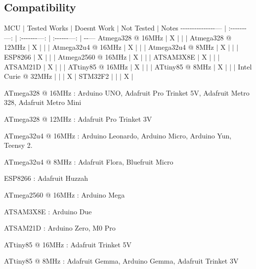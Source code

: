 \subsection*{Compatibility}

M\+CU $\vert$ Tested Works $\vert$ Doesn\textquotesingle{}t Work $\vert$ Not Tested $\vert$ Notes -\/-\/-\/-\/-\/-\/-\/-\/-\/-\/-\/-\/-\/-\/-\/--- $\vert$ \+:-\/-\/-\/-\/-\/-\/-\/---\+: $\vert$ \+:-\/-\/-\/-\/-\/-\/-\/---\+: $\vert$ \+:-\/-\/-\/-\/-\/-\/---\+: $\vert$ -\/-\/--- Atmega328 @ 16\+M\+Hz $\vert$ X $\vert$ $\vert$ $\vert$ Atmega328 @ 12\+M\+Hz $\vert$ X $\vert$ $\vert$ $\vert$ Atmega32u4 @ 16\+M\+Hz $\vert$ X $\vert$ $\vert$ $\vert$ Atmega32u4 @ 8\+M\+Hz $\vert$ X $\vert$ $\vert$ $\vert$ E\+S\+P8266 $\vert$ X $\vert$ $\vert$ $\vert$ Atmega2560 @ 16\+M\+Hz $\vert$ X $\vert$ $\vert$ $\vert$ A\+T\+S\+A\+M3\+X8E $\vert$ X $\vert$ $\vert$ $\vert$ A\+T\+S\+A\+M21D $\vert$ X $\vert$ $\vert$ $\vert$ A\+Ttiny85 @ 16\+M\+Hz $\vert$ X $\vert$ $\vert$ $\vert$ A\+Ttiny85 @ 8\+M\+Hz $\vert$ X $\vert$ $\vert$ $\vert$ Intel Curie @ 32\+M\+Hz $\vert$ $\vert$ $\vert$ X $\vert$ S\+T\+M32\+F2 $\vert$ $\vert$ $\vert$ X $\vert$


\begin{DoxyItemize}
\item A\+Tmega328 @ 16\+M\+Hz \+: Arduino U\+NO, Adafruit Pro Trinket 5V, Adafruit Metro 328, Adafruit Metro Mini
\item A\+Tmega328 @ 12\+M\+Hz \+: Adafruit Pro Trinket 3V
\item A\+Tmega32u4 @ 16\+M\+Hz \+: Arduino Leonardo, Arduino Micro, Arduino Yun, Teensy 2.
\item A\+Tmega32u4 @ 8\+M\+Hz \+: Adafruit Flora, Bluefruit Micro
\item E\+S\+P8266 \+: Adafruit Huzzah
\item A\+Tmega2560 @ 16\+M\+Hz \+: Arduino Mega
\item A\+T\+S\+A\+M3\+X8E \+: Arduino Due
\item A\+T\+S\+A\+M21D \+: Arduino Zero, M0 Pro
\item A\+Ttiny85 @ 16\+M\+Hz \+: Adafruit Trinket 5V
\item A\+Ttiny85 @ 8\+M\+Hz \+: Adafruit Gemma, Arduino Gemma, Adafruit Trinket 3V 
\end{DoxyItemize}